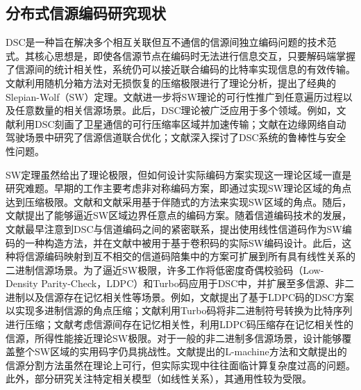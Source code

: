 \subsection{分布式信源编码研究现状}
DSC是一种旨在解决多个相互关联但互不通信的信源间独立编码问题的技术范式。其核心思想是，即使各信源节点在编码时无法进行信息交互，只要解码端掌握了信源间的统计相关性，系统仍可以接近联合编码的比特率实现信息的有效传输。文献\cite{1055037}利用随机分箱方法对无损恢复的压缩极限进行了理论分析，提出了经典的Slepian-Wolf（SW）定理。文献\cite{cover1999elements}进一步将SW理论的可行性推广到任意遍历过程以及任意数量的相关信源场景。此后，DSC理论被广泛应用于多个领域。例如，文献\cite{761254}利用DSC刻画了卫星通信的可行压缩率区域并加速传输；文献\cite{10620735}在边缘网络自动驾驶场景中研究了信源信道联合优化；文献\cite{4567562,4313115}深入探讨了DSC系统的鲁棒性与安全性问题。

SW定理虽然给出了理论极限，但如何设计实际编码方案实现这一理论区域一直是研究难题。早期的工作主要考虑非对称编码方案，即通过实现SW理论区域的角点达到压缩极限。文献\cite{1184140}和文献\cite{1512420}采用基于伴随式的方法来实现SW区域的角点。随后，文献\cite{1281475}提出了能够逼近SW区域边界任意点的编码方案。随着信道编码技术的发展，文献\cite{1055171}最早注意到DSC与信道编码之间的紧密联系，提出使用线性信道码作为SW编码的一种构造方法，并在文献\cite{1184140}中被用于基于卷积码的实际SW编码设计。此后，这种将信源编码映射到互不相交的信道码陪集中的方案可扩展到所有具有线性关系的二进制信源场景。为了逼近SW极限，许多工作将低密度奇偶校验码（Low-Density Parity-Check，LDPC）和Turbo码应用于DSC中，并扩展至多信源、非二进制以及信源存在记忆相关性等场景。例如，文献\cite{1281525}提出了基于LDPC码的DSC方案以实现多进制信源的角点压缩；文献\cite{1413577}利用Turbo码将非二进制符号转换为比特序列进行压缩；文献\cite{1187376}考虑信源间存在记忆相关性，利用LDPC码压缩存在记忆相关性的信源，所得性能接近理论SW极限。对于一般的非二进制多信源场景，设计能够覆盖整个SW区域的实用码字仍具挑战性。文献\cite{1281474}提出的L-machine方法和文献\cite{1661834}提出的信源分割方法虽然在理论上可行，但实际实现中往往面临计算复杂度过高的问题。此外，部分研究关注特定相关模型（如线性关系），其通用性较为受限。

